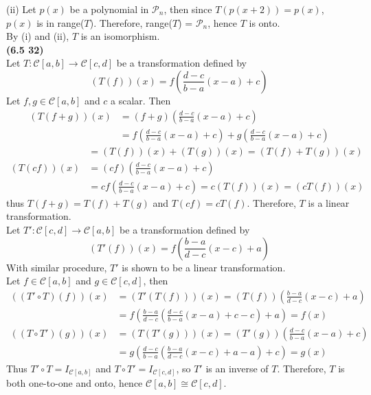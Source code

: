 (ii) Let $p(x)$ be a polynomial in $\mathscr{P}_n$, then since $T(p(x + 2)) = p(x)$, $p(x)$ is in range($T$). Therefore, range($T$) = $\mathscr{P}_n$, hence $T$ is onto. \\

By (i) and (ii), $T$ is an isomorphism. \\

\textbf{(6.5 32)} \\
Let $T: \mathscr{C}[a, b] \rightarrow \mathscr{C}[c, d]$ be a transformation defined by \begin{equation*}
	(T(f))(x) = f\left(\frac{d - c}{b - a}(x - a) + c\right)
\end{equation*}
Let $f, g \in \mathscr{C}[a, b]$ and $c$ a scalar. Then \begin{align*}
	(T(f + g))(x) &= (f + g)\left(\frac{d - c}{b - a}(x - a) + c\right) \\
	&= f\left(\frac{d - c}{b - a}(x - a) + c\right) + g\left(\frac{d - c}{b - a}(x - a) + c\right) \end{align*}
	\begin{align*}
	&= (T(f))(x) + (T(g))(x) = (T(f) + T(g))(x) \\
	(T(cf))(x) &= (cf)\left(\frac{d - c}{b - a}(x - a) + c\right) \\
	&= cf\left(\frac{d - c}{b - a}(x - a) + c\right) = c(T(f))(x) = (cT(f))(x)
\end{align*} thus $T(f + g) = T(f) + T(g)$ and $T(cf) = cT(f)$. Therefore, $T$ is a linear transformation. \\

Let $T': \mathscr{C}[c, d] \rightarrow \mathscr{C}[a, b]$ be a transformation defined by \begin{equation*}
	(T'(f))(x) = f\left(\frac{b - a}{d - c}(x - c) + a\right)
\end{equation*}
With similar procedure, $T'$ is shown to be a linear transformation. \\

Let $f \in \mathscr{C}[a,b]$ and $g \in \mathscr{C}[c, d]$, then \begin{align*}
	((T' \circ T)(f))(x) &= (T'(T(f)))(x) = (T(f))\left(\frac{b - a}{d - c}(x - c) + a\right) \\
	&= f\left(\frac{b - a}{d - c}\left(\frac{d - c}{b - a}(x - a) + c - c\right) + a\right) = f(x) \\
	((T \circ T')(g))(x) &= (T(T'(g)))(x) = (T'(g))\left(\frac{d - c}{b - a}(x - a) + c\right) \\
	&= g\left(\frac{d - c}{b - a}\left(\frac{b - a}{d - c}(x - c) + a - a\right) + c\right) = g(x)
\end{align*}
Thus $T' \circ T = I_{ \mathscr{C}[a,b] }$ and $T \circ T' = I_{ \mathscr{C}[c, d] }$, so $T'$ is an inverse of $T$. Therefore, $T$ is both one-to-one and onto, hence $\mathscr{C}[a,b] \cong \mathscr{C}[c,d]$. \\

